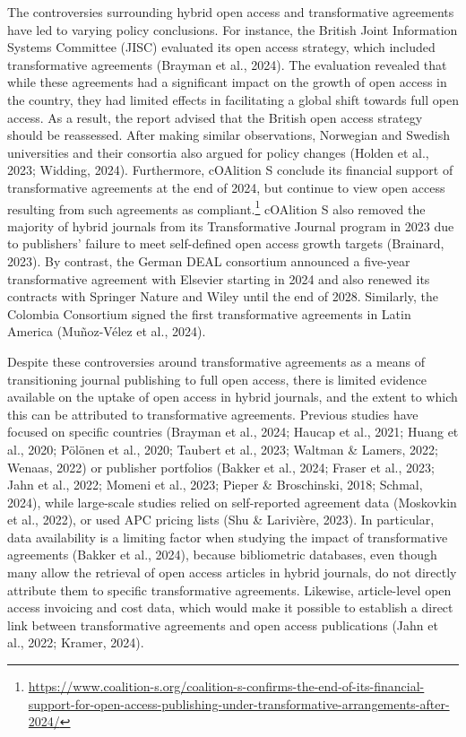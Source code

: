 \documentclass[a4paper,man,floatsintext,longtable,noextraspace,12pt]{apa6}
\begin{document}
The controversies surrounding hybrid open access and transformative
agreements have led to varying policy conclusions. For instance, the
British Joint Information Systems Committee (JISC) evaluated its open
access strategy, which included transformative agreements (Brayman et
al., 2024). The evaluation revealed that while these agreements had a
significant impact on the growth of open access in the country, they had
limited effects in facilitating a global shift towards full open access.
As a result, the report advised that the British open access strategy
should be reassessed. After making similar observations, Norwegian and
Swedish universities and their consortia also argued for policy changes
(Holden et al., 2023; Widding, 2024). Furthermore, cOAlition S conclude
its financial support of transformative agreements at the end of 2024,
but continue to view open access resulting from such agreements as
compliant.\footnote{\url{https://www.coalition-s.org/coalition-s-confirms-the-end-of-its-financial-support-for-open-access-publishing-under-transformative-arrangements-after-2024/}}
cOAlition S also removed the majority of hybrid journals from its
Transformative Journal program in 2023 due to publishers' failure to
meet self-defined open access growth targets (Brainard, 2023). By
contrast, the German DEAL consortium announced a five-year
transformative agreement with Elsevier starting in 2024 and also renewed
its contracts with Springer Nature and Wiley until the end of 2028.
Similarly, the Colombia Consortium signed the first transformative
agreements in Latin America (Muñoz-Vélez et al., 2024).

Despite these controversies around transformative agreements as a means
of transitioning journal publishing to full open access, there is
limited evidence available on the uptake of open access in hybrid
journals, and the extent to which this can be attributed to
transformative agreements. Previous studies have focused on specific
countries (Brayman et al., 2024; Haucap et al., 2021; Huang et al.,
2020; Pölönen et al., 2020; Taubert et al., 2023; Waltman \& Lamers,
2022; Wenaas, 2022) or publisher portfolios (Bakker et al., 2024; Fraser
et al., 2023; Jahn et al., 2022; Momeni et al., 2023; Pieper \&
Broschinski, 2018; Schmal, 2024), while large-scale studies relied on
self-reported agreement data (Moskovkin et al., 2022), or used APC
pricing lists (Shu \& Larivière, 2023). In particular, data availability
is a limiting factor when studying the impact of transformative
agreements (Bakker et al., 2024), because bibliometric databases, even
though many allow the retrieval of open access articles in hybrid
journals, do not directly attribute them to specific transformative
agreements. Likewise, article-level open access invoicing and cost data,
which would make it possible to establish a direct link between
transformative agreements and open access publications (Jahn et al.,
2022; Kramer, 2024).
\end{document}
